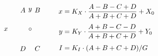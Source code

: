 $
\newgraphescape{b}#1#2#3{
    "z"[#2#3(1.5)]   %
    [l(0.8)]-[r(1.6)] [l(0.8)]-[#2(1.5)] %
    [#2]*{#1} %
}
\vcenter{
\xygraph{
    !{0;<0.7em,0em>:0}
    []="z"
    !bAul !bBur !bCdr !bDdl
    "z"[u(2)l(3)] ="a" "z"[d(2)r(3)] ="c"   
        !{ "a"."c"*\frm<1em>{-} }
    "z"*+{\circ} ="o" :[u(4)]*+{y} "o":[l(5)]*+{x}
}
}
\qquad
\begin{aligned}
    x &= K_X \cdot \frac{A-B-C+D}{A+B+C+D} + X_0 \\[0.4em]
    y &= K_Y \cdot \frac{A+B-C-D}{A+B+C+D} + Y_0 \\[0.4em]
    I &= K_I \cdot (A+B+C+D) / G
\end{aligned}
$
